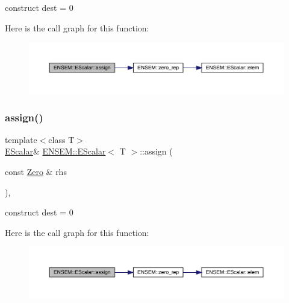 construct dest = 0 

Here is the call graph for this function\+:
\nopagebreak
\begin{figure}[H]
\begin{center}
\leavevmode
\includegraphics[width=350pt]{d0/d82/classENSEM_1_1EScalar_a6900444b0a609115a30ef8fc95a43da5_cgraph}
\end{center}
\end{figure}
\mbox{\label{classENSEM_1_1EScalar_a6900444b0a609115a30ef8fc95a43da5}} 
\subsubsection{\texorpdfstring{assign()}{assign()}\hspace{0.1cm}{\footnotesize\ttfamily [4/6]}}
{\footnotesize\ttfamily template$<$class T$>$ \\
\mbox{\hyperlink{classENSEM_1_1EScalar}{E\+Scalar}}\& \mbox{\hyperlink{classENSEM_1_1EScalar}{E\+N\+S\+E\+M\+::\+E\+Scalar}}$<$ T $>$\+::assign (\begin{DoxyParamCaption}\item[{const \mbox{\hyperlink{structENSEM_1_1Zero}{Zero}} \&}]{rhs }\end{DoxyParamCaption})\hspace{0.3cm}{\ttfamily [inline]}, {\ttfamily [protected]}}



construct dest = 0 

Here is the call graph for this function\+:
\nopagebreak
\begin{figure}[H]
\begin{center}
\leavevmode
\includegraphics[width=350pt]{d0/d82/classENSEM_1_1EScalar_a6900444b0a609115a30ef8fc95a43da5_cgraph}
\end{center}
\end{figure}
\mbox{\label{classENSEM_1_1EScalar_aa9a54e03830d13eb6a124c64c6a46dd1}} 

